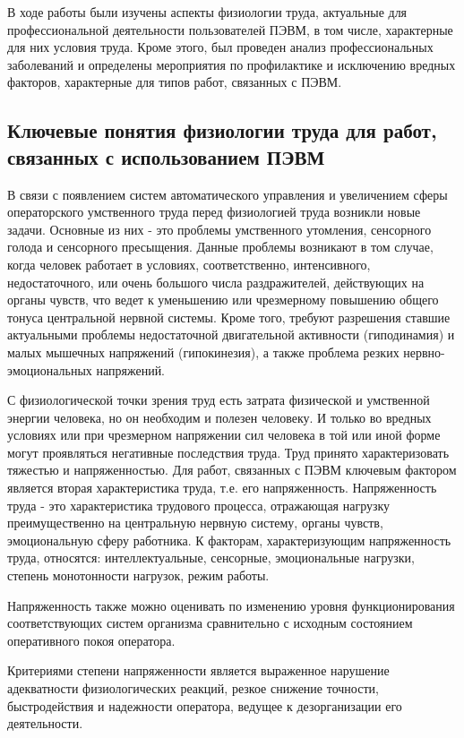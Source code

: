 В ходе работы были изучены аспекты физиологии труда, актуальные для профессиональной деятельности пользователей ПЭВМ, в том числе, характерные для них условия труда. Кроме этого, был проведен анализ профессиональных заболеваний и определены мероприятия по профилактике и исключению вредных факторов, характерные для типов работ, связанных с ПЭВМ.

\subsection{Ключевые понятия физиологии труда для работ, связанных с использованием ПЭВМ}
В связи с появлением систем автоматического управления и увеличением сферы операторского умственного труда перед физиологией труда возникли новые задачи. Основные из них - это проблемы умственного утомления, сенсорного голода и сенсорного пресыщения. Данные проблемы возникают в том случае, когда человек работает в условиях, соответственно, интенсивного, недостаточного, или очень большого числа раздражителей, действующих на органы чувств, что ведет к уменьшению или чрезмерному повышению общего тонуса центральной нервной системы. Кроме того, требуют разрешения ставшие актуальными проблемы недостаточной двигательной активности (гиподинамия) и малых мышечных напряжений (гипокинезия), а также проблема резких нервно-эмоциональных напряжений.

С физиологической точки зрения труд есть затрата физической и умственной энергии человека, но он необходим и полезен человеку. И только во вредных условиях или при чрезмерном напряжении сил человека в той или иной форме могут проявляться негативные последствия труда. Труд принято характеризовать тяжестью и напряженностью. Для работ, связанных с ПЭВМ ключевым фактором является вторая характеристика труда, т.е. его напряженность.
Напряженность труда - это характеристика трудового процесса, отражающая нагрузку преимущественно на центральную нервную систему, органы чувств, эмоциональную сферу работника. К факторам, характеризующим напряженность труда, относятся: интеллектуальные, сенсорные, эмоциональные нагрузки, степень монотонности нагрузок, режим работы.

Напряженность также можно оценивать по изменению уровня функционирования соответствующих систем организма сравнительно с исходным состоянием оперативного покоя оператора.

Критериями степени напряженности является выраженное нарушение адекватности физиологических реакций, резкое снижение точности, быстродействия и надежности оператора, ведущее к дезорганизации его деятельности.

